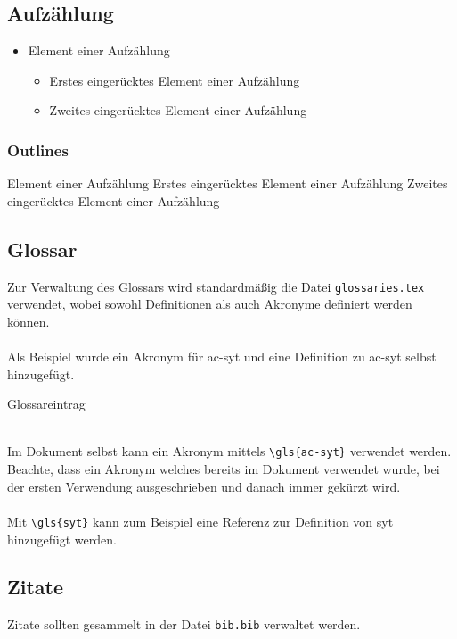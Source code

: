 \newpage
\subsection{Aufzählung}
\begin{itemize}
	\item Element einer Aufzählung
	\begin{itemize}
        \item Erstes eingerücktes Element einer Aufzählung
        \item Zweites eingerücktes Element einer Aufzählung
    \end{itemize}
\end{itemize}

\subsubsection{Outlines}
\begin{outline}
    \1 Element einer Aufzählung
        \2 Erstes eingerücktes Element einer Aufzählung
        \2 Zweites eingerücktes Element einer Aufzählung
\end{outline}

\subsection{Glossar}
Zur Verwaltung des Glossars wird standardmäßig die Datei \texttt{glossaries.tex} verwendet, wobei sowohl Definitionen als auch Akronyme definiert werden können.
\\\\
Als Beispiel wurde ein Akronym für \gls{ac-syt} und eine Definition zu \gls{ac-syt} selbst hinzugefügt.

\begin{listing}
\caption{Glossareintrag}
\label{lst:glossaries}
\end{listing}
~\\
Im Dokument selbst kann ein Akronym mittels \verb|\gls{ac-syt}| verwendet werden. Beachte, dass ein Akronym welches bereits im Dokument verwendet wurde, bei der ersten Verwendung ausgeschrieben und danach immer gekürzt wird.
\\\\
Mit \verb|\gls{syt}| kann zum Beispiel eine Referenz zur Definition von \gls{syt} hinzugefügt werden.

\subsection{Zitate}
Zitate sollten gesammelt in der Datei \texttt{bib.bib} verwaltet werden.

